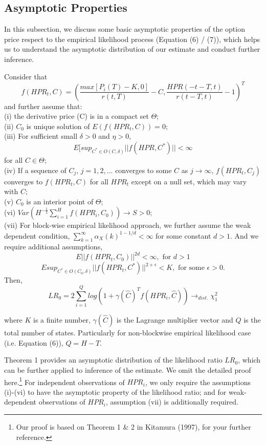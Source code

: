 \subsection{Asymptotic Properties} 
In this subsection, we discuss some basic asymptotic properties of the option price respect to the empirical likelihood process (Equation (6) / (7)), which helps us to understand the asymptotic distribution of our estimate and conduct further inference.  
\begin{theorem}
Consider that
\[
f(HPR_t,C)=(\frac{max[P_i(T)-K,0]}{r(t,T)}-C, \frac{HPR(-t-T,t)}{r(t-T,t)}-1)^T
\]
and further assume that:\\
(i) the derivative price (C) is in a compact set $\Theta$; \\
(ii) $C_0$ is unique solution of $E(f(HPR_t,C))=0$;\\
(iii) For sufficient small $\delta>0$ and $\eta>0$, 
\[
E[sup_{C^*\in O(C,\delta)}||f(HPR,C^*)||<\infty 
\]
for all $C \in \Theta$;\\
(iv) If a sequence of $C_j$, $j=1,2,...$ converges to some $C$ as $j\rightarrow \infty$, $f(HPR_t,C_j)$ converges to $f(HPR_t,C)$ for all $HPR_t$ except on a null set, which may vary with $C$;\\
(v) $C_0$ is an interior point of $\Theta$;\\
(vi) $Var(H^{-\frac{1}{2}} \sum_{i=1}^H f(HPR_i,C_0))\rightarrow S >0$;\\
(vii) For block-wise empirical likelihood approach, we further assume the weak dependent condition, $\sum_{k=1}^\infty \alpha_X(k)^{1-1/d} <\infty$ for some constant $d>1$. And we require additional assumptions, 
\[
E||f(HPR_t,C_0)||^{2d}<\infty, \text{ for } d>1 
\]  
\[
E sup_{C^* \in O(C_0,\delta)} ||f(HPR_t,C^*)||^{2+\epsilon}<K, \text{ for some }\epsilon>0.
\]
Then, 
\[
LR_0=2\sum_{i=1}^Q log(1+\gamma(\hat{C})^T f(HPR_i,\hat{C})) \rightarrow_{dist.}  \chi _1^2
\]
\end{theorem}
where $K$ is a finite number, $\gamma(\hat{C})$ is the Lagrange multiplier vector and $Q$ is the total number of states. Particularly for non-blockwise empirical likelihood case (i.e. Equation (6)), $Q=H-T$.

Theorem 1 provides an asymptotic distribution of the likelihood ratio $LR_0$, which can be further applied to inference of the estimate. We omit the detailed proof here.\footnote{Our proof is based on Theorem 1 \& 2 in Kitamura (1997), for your further reference. } For independent observations of $HPR_i$, we only require the assumptions (i)-(vi) to have the asymptotic property of the likelihood ratio; and for weak-dependent observations of $HPR_i$, assumption (vii) is additionally required. 




